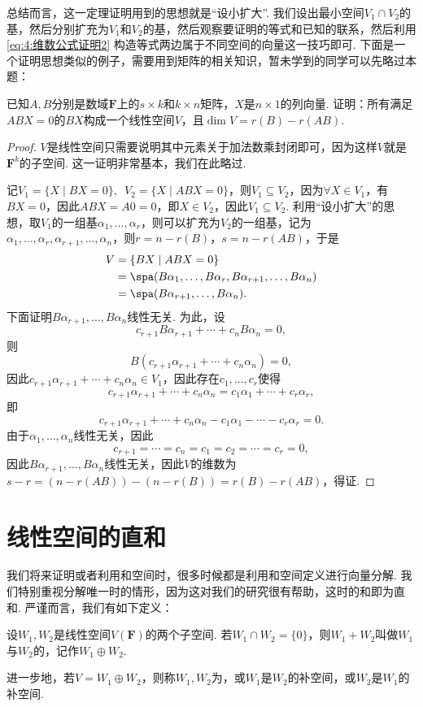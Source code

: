 总结而言，这一定理证明用到的思想就是``设小扩大''. 我们设出最小空间$V_1\cap V_2$的基，然后分别扩充为$V_1$和$V_2$的基，然后观察要证明的等式和已知的联系，然后利用\autoref{eq:4:维数公式证明2} 构造等式两边属于不同空间的向量这一技巧即可. 下面是一个证明思想类似的例子，需要用到矩阵的相关知识，暂未学到的同学可以先略过本题：
\begin{example}
    已知$A,B$分别是数域$\mathbf{F}$上的$s \times k$和$k \times n$矩阵，$X$是$n \times 1$的列向量. 证明：所有满足$ABX=0$的$BX$构成一个线性空间$V$，且$\dim V = r(B) - r(AB)$.
\end{example}

\begin{proof}
    $V$是线性空间只需要说明其中元素关于加法数乘封闭即可，因为这样$V$就是$\mathbf{F}^k$的子空间. 这一证明非常基本，我们在此略过.

    记$V_1=\{X\mid BX=0\},\enspace V_2=\{X\mid ABX=0\}$，则$V_1\subseteq V_2$，因为$\forall X\in V_1$，有$BX=0$，因此$ABX=A0=0$，即$X\in V_2$，因此$V_1\subseteq V_2$. 利用``设小扩大''的思想，取$V_1$的一组基$\alpha_1,\ldots,\alpha_r$，则可以扩充为$V_2$的一组基，记为$\alpha_1,\ldots,\alpha_r,\alpha_{r+1},\ldots,\alpha_n$，则$r=n-r(B)$，$s=n-r(AB)$，于是
    \begin{align*}
        V & =\{BX\mid ABX=0\}                                                \\
          & =\spa(B\alpha_1,\ldots,B\alpha_r,B\alpha_{r+1},\ldots,B\alpha_n) \\
          & =\spa(B\alpha_{r+1},\ldots,B\alpha_n).
    \end{align*}
    下面证明$B\alpha_{r+1},\ldots,B\alpha_n$线性无关. 为此，设
    \[c_{r+1}B\alpha_{r+1}+\cdots+c_nB\alpha_n=0,\]
    则
    \[B(c_{r+1}\alpha_{r+1}+\cdots+c_n\alpha_n)=0,\]
    因此$c_{r+1}\alpha_{r+1}+\cdots+c_n\alpha_n\in V_1$，因此存在$c_1,\ldots,c_r$使得
    \[c_{r+1}\alpha_{r+1}+\cdots+c_n\alpha_n=c_1\alpha_1+\cdots+c_r\alpha_r,\]
    即
    \[c_{r+1}\alpha_{r+1}+\cdots+c_n\alpha_n-c_1\alpha_1-\cdots-c_r\alpha_r=0.\]
    由于$\alpha_1,\ldots,\alpha_n$线性无关，因此
    \[c_{r+1}=\cdots=c_n=c_1=c_2=\cdots=c_r=0,\]
    因此$B\alpha_{r+1},\ldots,B\alpha_n$线性无关，因此$V$的维数为$s-r=(n-r(AB))-(n-r(B))=r(B)-r(AB)$，得证.
\end{proof}

\section{线性空间的直和}

我们将来证明或者利用和空间时，很多时候都是利用和空间定义进行向量分解. 我们特别重视分解唯一时的情形，因为这对我们的研究很有帮助，这时的和即为直和. 严谨而言，我们有如下定义：
\begin{definition}
    设$W_1,W_2$是线性空间$V(\mathbf{F})$的两个子空间. 若$W_1 \cap W_2=\{0\}$，则$W_1+W_2$叫做$W_1$与$W_2$的，记作$W_1\oplus W_2$.

    进一步地，若$V=W_1\oplus W_2$，则称$W_1,W_2$为，或$W_1$是$W_2$的补空间，或$W_2$是$W_1$的补空间.
\end{definition}

